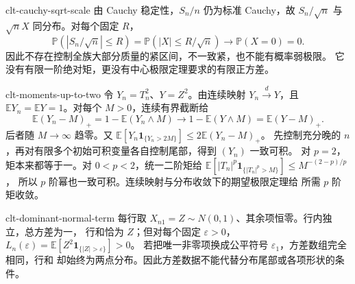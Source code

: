 \begin{solution}{clt-cauchy-sqrt-scale}
由 Cauchy 稳定性，$S_n/n$ 仍为标准 Cauchy，故
$S_n/\sqrt n$ 与 $\sqrt nX$ 同分布。对每个固定 $R$，
\[
 \mathbb P(|S_n/\sqrt n|\le R)
 =\mathbb P(|X|\le R/\sqrt n)\longrightarrow\mathbb P(X=0)=0.
\]
因此不存在控制全族大部分质量的紧区间，不一致紧，也不能有概率弱极限。
它没有有限一阶绝对矩，更没有中心极限定理要求的有限正方差。
\end{solution}

\begin{solution}{clt-moments-up-to-two}
令 $Y_n=T_n^2$、$Y=Z^2$。由连续映射 $Y_n\xrightarrow dY$，且
$\mathbb EY_n=\mathbb EY=1$。对每个 $M>0$，连续有界截断给
\[
 \mathbb E(Y_n-M)_+=1-\mathbb E(Y_n\wedge M)
 \longrightarrow1-\mathbb E(Y\wedge M)=\mathbb E(Y-M)_+.
\]
后者随 $M\to\infty$ 趋零。又
$\mathbb E[Y_n\mathbf1_{\{Y_n>2M\}}]\le2\mathbb E(Y_n-M)_+$。
先控制充分晚的 $n$，再对有限多个初始可积变量各自控制尾部，得到
$(Y_n)$ 一致可积。
对 $p=2$，矩本来都等于一。对 $0<p<2$，统一二阶矩给
$\mathbb E[|T_n|^p\mathbf1_{\{|T_n|^p>M\}}]\le M^{-(2-p)/p}$，
所以 $p$ 阶幂也一致可积。连续映射与分布收敛下的期望极限定理给
所需 $p$ 阶矩收敛。
\end{solution}

\begin{solution}{clt-dominant-normal-term}
每行取 $X_{n1}=Z\sim N(0,1)$、其余项恒零。行内独立，总方差为一，
行和恰为 $Z$；但对每个固定 $\varepsilon>0$，
$L_n(\varepsilon)=\mathbb E[Z^2\mathbf1_{\{|Z|>\varepsilon\}}]>0$。
若把唯一非零项换成公平符号 $\varepsilon_1$，方差数组完全相同，行和
却始终为两点分布。因此方差数据不能代替分布尾部或各项形状的条件。
\end{solution}
